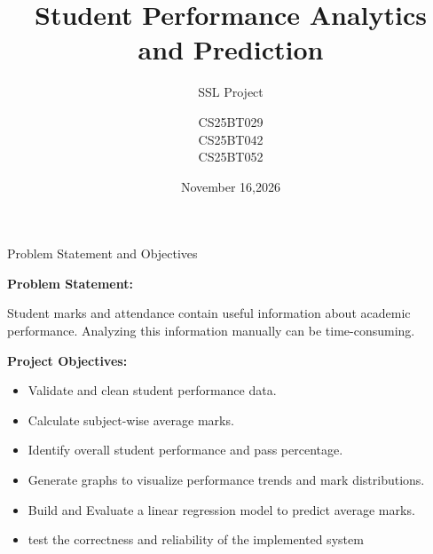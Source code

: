 \documentclass{beamer}
\title{Student Performance Analytics and Prediction}
\subtitle{SSL Project}
\author{
CS25BT029 \\
CS25BT042 \\
CS25BT052 }
\institute{\large Indian Institute of Technology Dharwad}
\date{November 16,2026}
\begin{document}
\begin{frame}
    \titlepage
\end{frame}

\begin{frame}{Problem Statement and Objectives}

\textbf{Problem Statement:}

Student marks and attendance contain useful information about academic performance. Analyzing this information manually can be time-consuming.

\vspace{0.3cm}

\textbf{Project Objectives:}

\begin{itemize}
\item Validate and clean student performance data.
        \item Calculate subject-wise average marks.
        \item Identify overall student performance and pass percentage.
        \item Generate graphs to visualize performance trends and mark distributions.
        \item  Build and Evaluate a linear regression model to predict average marks.
        \item test the correctness and reliability of the implemented system
\end{itemize}

\end{frame}
\end{document}
